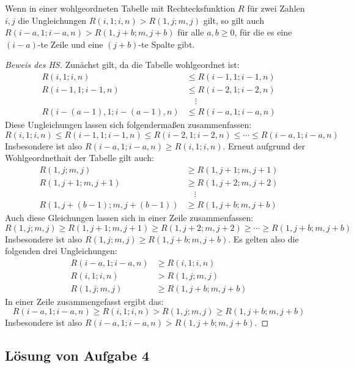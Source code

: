 \begin{lem}\label{mehr_nuller}
    Wenn in einer wohlgeordneten Tabelle mit Rechtecksfunktion $R$ für zwei Zahlen $i, j$ die Ungleichungen 
    $R(i, 1; i, n)>R(1, j; m, j)$ gilt, so gilt auch $R(i-a, 1; i-a, n)>R(1, j+b; m, j+b)$ für alle $a, b\geq0$, für 
    die es eine $(i-a)$-te Zeile und eine $(j+b)$-te Spalte gibt.
\end{lem}
\begin{proof}[Beweis des HS]
    Zunächst gilt, da die Tabelle wohlgeordnet ist:
    \begin{align*}
        R(i, 1; i, n)&\leq R(i-1, 1; i-1, n)\\
        R(i-1, 1; i-1, n)&\leq R(i-2, 1; i-2, n)\\
        &\quad\vdots\\
        R(i-(a-1), 1; i-(a-1), n)&\leq R(i-a, 1; i-a, n)
    \end{align*}
    Diese Ungleichungen lassen sich folgendermaßen zusammenfassen:
    \[
        R(i, 1; i, n)\leq R(i-1, 1; i-1, n)\leq R(i-2, 1; i-2, n)\leq\cdots\leq R(i-a, 1; i-a, n)
    \]
    Insbesondere ist also $R(i-a, 1; i-a, n)\geq R(i, 1; i, n)$. Erneut aufgrund der Wohlgeordnethait der Tabelle 
    gilt auch:
    \begin{align*}
        R(1, j; m, j)&\geq R(1, j+1; m, j+1)\\
        R(1, j+1; m, j+1)&\geq R(1, j+2; m, j+2)\\
        &\quad\vdots\\
        R(1, j+(b-1); m, j+(b-1))&\geq R(1, j+b; m, j+b)
    \end{align*}
    Auch diese Gleichungen lassen sich in einer Zeile zusammenfassen:
    \[
        R(1, j; m, j)\geq R(1, j+1; m, j+1)\geq R(1, j+2; m, j+2)\geq\cdots\geq R(1, j+b; m, j+b)
    \]
    Insbesondere ist also $R(1, j; m, j)\geq R(1, j+b; m, j+b)$. Es gelten also die folgenden drei Ungleichungen:
    \begin{align*}
        R(i-a, 1; i-a, n)&\geq R(i, 1; i, n)\\
        R(i, 1; i, n)&>R(1, j; m, j)\\
        R(1, j; m, j)&\geq R(1, j+b; m, j+b)
    \end{align*}
    In einer Zeile zusammengefasst ergibt das:
    \[
        R(i-a, 1; i-a, n)\geq R(i, 1; i, n)>R(1, j; m, j)\geq R(1, j+b; m, j+b)
    \]
    Insbesondere ist also $R(i-a, 1; i-a, n)>R(1, j+b; m, j+b)$.
\end{proof}

\subsection*{Lösung von Aufgabe 4}

